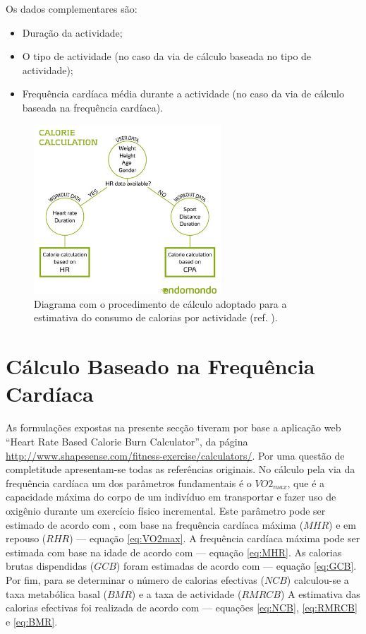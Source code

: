 \documentclass[a4paper,10pt]{report}
\begin{document}
Os dados complementares são:
\begin{itemize}
 \item Duração da actividade;
 \item O tipo de actividade (no caso da via de cálculo baseada no tipo de actividade);
 \item Frequência cardíaca média durante a actividade (no caso da via de cálculo baseada na frequência cardíaca).
\end{itemize}

\begin{figure}
\centering
\includegraphics[width=7cm]{endomondoCalories.jpg}
\caption{Diagrama com o procedimento de cálculo adoptado para a estimativa do consumo de calorias por actividade (ref. \cite{endomondo}).}
\label{fig:caloriasProcedimento}
\end{figure}

\section{Cálculo Baseado na Frequência Cardíaca}
\label{sec:caloriasFcardio}
As formulações expostas na presente secção tiveram por base a aplicação web ``Heart Rate Based Calorie Burn Calculator'', 
da página \url{http://www.shapesense.com/fitness-exercise/calculators/}. Por uma questão de completitude apresentam-se todas as referências originais.
No cálculo pela via da frequência cardíaca um dos parâmetros fundamentais é o $VO2_{max}$, que é a capacidade máxima do corpo de um 
indivíduo em transportar e fazer uso de oxigênio durante um exercício físico incremental.
Este parâmetro pode ser estimado de acordo com \cite{VO2max}, com base na frequência cardíaca máxima ($MHR$) e em 
repouso ($RHR$) --- equação \ref{eq:VO2max}.
A frequência cardíaca máxima pode ser estimada com base na idade de acordo com \cite{MHR} --- equação \ref{eq:MHR}.
As calorias brutas dispendidas ($GCB$) foram estimadas de acordo com \cite{GCB} --- equação \ref{eq:GCB}.
Por fim, para se determinar o número de calorias efectivas ($NCB$) calculou-se a taxa metabólica basal ($BMR$) e a taxa de actividade ($RMRCB$)
A estimativa das calorias efectivas foi realizada de acordo com \cite{NCB} --- equações \ref{eq:NCB}, \ref{eq:RMRCB} e \ref{eq:BMR}.
\end{document}
